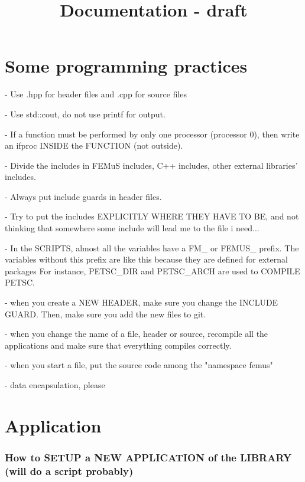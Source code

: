 \documentclass[10pt]{book}
\title{Documentation - draft}
\author{}
\date{}
\begin{document}
\maketitle

 \setcounter{tocdepth}{4}
\setcounter{secnumdepth}{4}
\tableofcontents 
{}



\part{Some programming practices}

- Use .hpp for header files and .cpp for source files

- Use std::cout, do not use printf for output.

- If a function must be performed by only one processor (processor 0),
then write an ifproc INSIDE the FUNCTION (not outside).

- Divide the includes in 
FEMuS includes,
 C++ includes,
 other external libraries' includes.

- Always put include guards in header files.

- Try to put the includes EXPLICITLY WHERE THEY HAVE TO BE, 
  and not thinking that somewhere some include will lead me to the file i need...

- In the SCRIPTS, almost all the variables have a FM\_ or FEMUS\_ prefix.
 The variables without this prefix are like this because 
 they are defined for external packages
 For instance, PETSC\_DIR and PETSC\_ARCH are used to COMPILE PETSC.
 
 - when you create a NEW HEADER, make sure you change the INCLUDE GUARD.
 Then, make sure you add the new files to git.
 
 - when you change the name of a file, header or source, recompile all the applications
   and make sure that everything compiles correctly.
   
 - when you start a file, put the source code among the "namespace femus"

 - data encapsulation, please
 
 
\part{Application}



 \section{How to SETUP a NEW APPLICATION of the LIBRARY (will do a script probably)}
\end{document}

